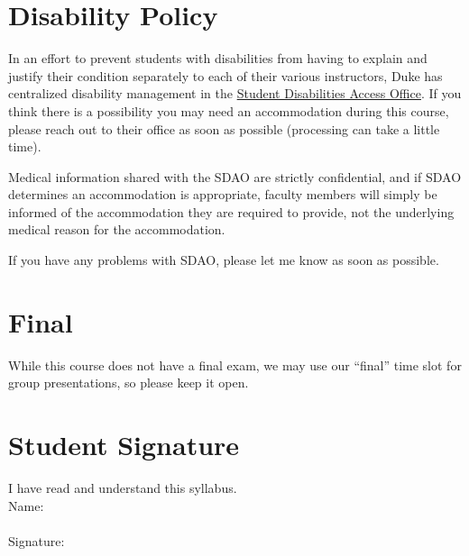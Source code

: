 \documentclass[12pt]{article}
\begin{document}
\section{Disability Policy}

In an effort to prevent students with disabilities from having to explain and justify their condition separately to each of their various instructors, Duke has centralized disability management in the \href{https://access.duke.edu/students}{Student Disabilities Access Office}. If you think there is a possibility you may need an accommodation during this course, please reach out to their office as soon as possible (processing can take a little time).

Medical information shared with the SDAO are strictly confidential, and if SDAO determines an accommodation is appropriate, faculty members will simply be informed of the accommodation they are required to provide, not the underlying medical reason for the accommodation.

If you have any problems with SDAO, please let me know as soon as possible.

\section{Final}

While this course does not have a final exam, we may use our ``final'' time slot for group presentations, so please keep it open.

\section{Student Signature}

I have read and understand this syllabus. \\


Name: \\
\vspace{2cm}\\
Signature:
\end{document}
